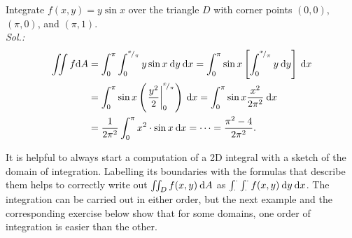 \begin{example}
\label{expl:mult_int_1}
Integrate $f(x,y)=y \sin x$ over the triangle $D$ with corner points $(0,0)$, $(\pi,0)$, and $(\pi,1)$. \\
{\it Sol.:}
\begin{equation*}
\begin{split}
\iint f \mathrm{d} A & = \int_{0}^{\pi} \int_{0}^{{}^{x}\!/_{\pi}} y\sin x \: \mathrm{d} y \: \mathrm{d} x 
= \int_{0}^{\pi} \sin x \left[\int_{0}^{{}^{x}\!/_{\pi}} y \: \mathrm{d} y\right] \: \mathrm{d} x \\ 
& = \int_{0}^{\pi} \sin x \left(\left.\frac{y^2}{2}\right|_0^{{}^{x}\!/_{\pi}}\right) \: \mathrm{d} x 
= \int_{0}^{\pi} \sin x \frac{x^2}{2\pi^2} \: \mathrm{d} x \\
& = \frac{1}{2\pi^2}\int_{0}^{\pi} x^2 \cdot \sin x \: \mathrm{d} x = \dots = \frac{\pi^2-4}{2\pi^2}.
\end{split}
\end{equation*}
\end{example}

\begin{remark}
It is helpful to always start a computation of a 2D integral with a sketch of the domain of integration. Labelling its boundaries with the formulas that describe them helps to correctly write out $\iint_D f(x,y) \: \mathrm{d} A$ as $\int_{\cdot}^{\cdot} \int_{\cdot}^{\cdot} f(x,y) \: \mathrm{d} y \: \mathrm{d} x$. The integration can be carried out in either order, but the next example and the corresponding exercise below show that for some domains, one order of integration is easier than the other.
\end{remark}

